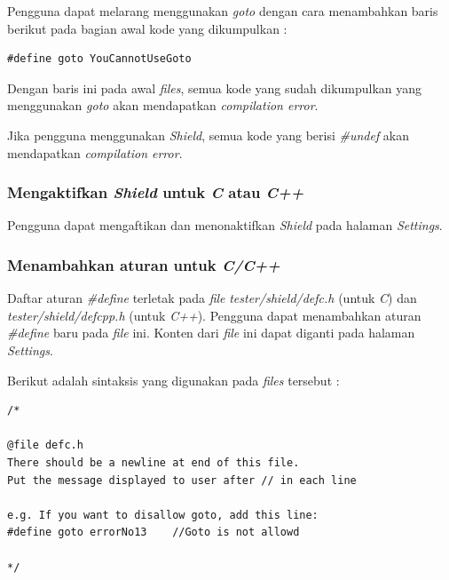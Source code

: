 \documentclass[a4paper,twoside]{article}
\begin{document}
\begin{enumerate}
		Pengguna dapat melarang menggunakan \textit{goto} dengan cara menambahkan baris berikut pada bagian awal kode yang dikumpulkan :
		
		\begin{lstlisting}[basicstyle=\ttfamily, frame=single,
		columns=fullflexible, keepspaces=true, breaklines=true, label=ls:19]
#define goto YouCannotUseGoto
		\end{lstlisting}
		
		Dengan baris ini pada awal \textit{files}, semua kode yang sudah dikumpulkan yang menggunakan \textit{goto} akan mendapatkan \textit{compilation error}.
		
		Jika pengguna menggunakan \textit{Shield}, semua kode yang berisi \textit{\#undef} akan mendapatkan \textit{compilation error}.
		
		\subsubsection*{Mengaktifkan \textit{Shield} untuk \textit{C} atau \textit{C++}}
		\label{subsubsec:mengaktifkan_shield_c/c++}
		Pengguna dapat mengaftikan dan menonaktifkan \textit{Shield} pada halaman \textit{Settings}.
		
		\subsubsection*{Menambahkan aturan untuk \textit{C/C++}}
		\label{subsubsec:menambah_aturan_c/c++}
		Daftar aturan \textit{\#define} terletak pada \textit{file} \textit{tester/shield/defc.h} (untuk \textit{C}) dan \textit{tester/shield/defcpp.h} (untuk \textit{C++}). Pengguna dapat menambahkan aturan \textit{\#define} baru pada \textit{file} ini. Konten dari \textit{file} ini dapat diganti pada halaman \textit{Settings}.
		
		Berikut adalah sintaksis yang digunakan pada \textit{files} tersebut :
		
		\begin{lstlisting}[basicstyle=\ttfamily, frame=single,
		columns=fullflexible, keepspaces=true, breaklines=true, label=ls:20]
/*

@file defc.h
There should be a newline at end of this file.
Put the message displayed to user after // in each line

e.g. If you want to disallow goto, add this line:
#define goto errorNo13    //Goto is not allowd

*/


\end{lstlisting}
\end{enumerate}
\end{document}
